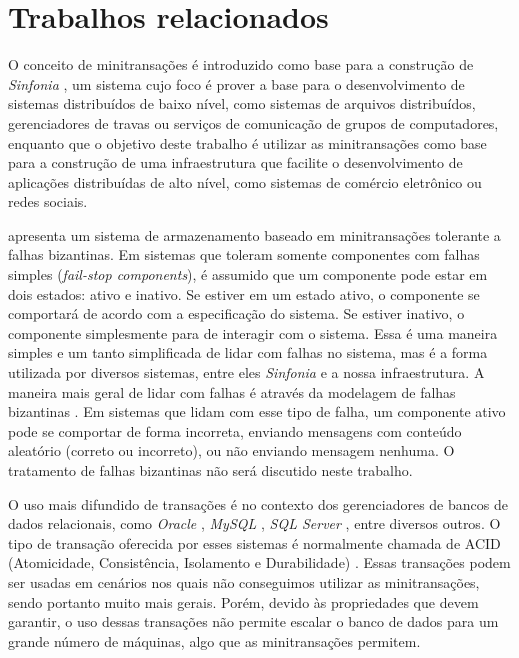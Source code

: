 \documentclass[11pt,twoside,a4paper]{book}
\begin{document}
\section{Trabalhos relacionados}
\label{sec:trabalhos_relacionados}
O conceito de minitransações é introduzido como base para a construção de \emph{Sinfonia} \cite{sinfonia}, um sistema cujo foco é prover a base para o desenvolvimento de sistemas distribuídos de baixo nível, como sistemas de arquivos distribuídos, gerenciadores de travas ou serviços de comunicação de grupos de computadores, enquanto que o objetivo deste trabalho é utilizar as minitransações como base para a construção de uma infraestrutura que facilite o desenvolvimento de aplicações distribuídas de alto nível, como sistemas de comércio eletrônico ou redes sociais.

\cite{padilha} apresenta um sistema de armazenamento baseado em minitransações tolerante a falhas bizantinas. Em sistemas que toleram somente componentes com falhas simples (\emph{fail-stop components}), é assumido que um componente pode estar em dois estados: ativo e inativo. Se estiver em um estado ativo, o componente se comportará de acordo com a especificação do sistema. Se estiver inativo, o componente simplesmente para de interagir com o sistema. Essa é uma maneira simples e um tanto simplificada de lidar com falhas no sistema, mas é a forma utilizada por diversos sistemas, entre eles \emph{Sinfonia} e a nossa infraestrutura. A maneira mais geral de lidar com falhas é através da modelagem de falhas bizantinas \cite{byzantine}. Em sistemas que lidam com esse tipo de falha, um componente ativo pode se comportar de forma incorreta, enviando mensagens com conteúdo aleatório (correto ou incorreto), ou não enviando mensagem nenhuma. O tratamento de falhas bizantinas não será discutido neste trabalho.

O uso mais difundido de transações é no contexto dos gerenciadores de bancos de dados relacionais, como \emph{Oracle} \cite{oracle}, \emph{MySQL} \cite{mysql}, \emph{SQL Server} \cite{sqlserver}, entre diversos outros. O tipo de transação oferecida por esses sistemas é normalmente chamada de ACID (Atomicidade, Consistência, Isolamento e Durabilidade) \cite{vaca}. Essas transações podem ser usadas em cenários nos quais não conseguimos utilizar as minitransações, sendo portanto muito mais gerais. Porém, devido às propriedades que devem garantir, o uso dessas transações não permite escalar o banco de dados para um grande número de máquinas, algo que as minitransações permitem.
\end{document}
